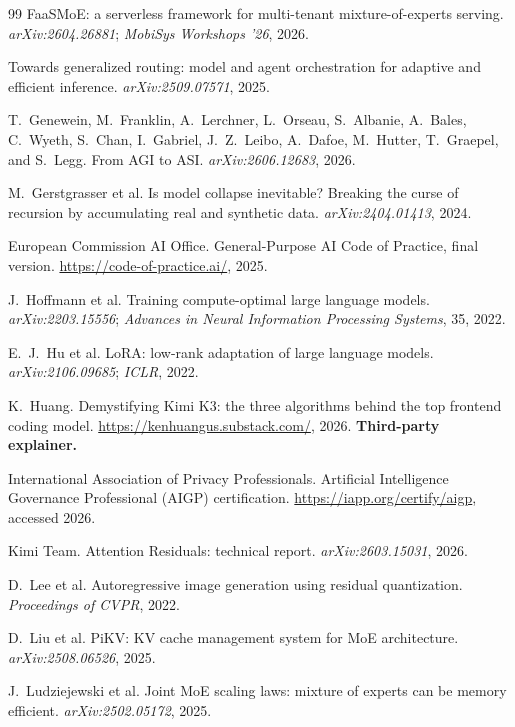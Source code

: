 \documentclass[11pt]{article}
\begin{document}
\begin{thebibliography}{99}
 FaaSMoE: a serverless framework for multi-tenant mixture-of-experts serving. \emph{arXiv:2604.26881}; \emph{MobiSys Workshops '26}, 2026.

 Towards generalized routing: model and agent orchestration for adaptive and efficient inference. \emph{arXiv:2509.07571}, 2025.

 T.~Genewein, M.~Franklin, A.~Lerchner, L.~Orseau, S.~Albanie, A.~Bales, C.~Wyeth, S.~Chan, I.~Gabriel, J.~Z.~Leibo, A.~Dafoe, M.~Hutter, T.~Graepel, and S.~Legg. From AGI to ASI. \emph{arXiv:2606.12683}, 2026.

 M.~Gerstgrasser et al. Is model collapse inevitable? Breaking the curse of recursion by accumulating real and synthetic data. \emph{arXiv:2404.01413}, 2024.

 European Commission AI Office. General-Purpose AI Code of Practice, final version. \url{https://code-of-practice.ai/}, 2025.

 J.~Hoffmann et al. Training compute-optimal large language models. \emph{arXiv:2203.15556}; \emph{Advances in Neural Information Processing Systems}, 35, 2022.

 E.~J.~Hu et al. LoRA: low-rank adaptation of large language models. \emph{arXiv:2106.09685}; \emph{ICLR}, 2022.

 K.~Huang. Demystifying Kimi K3: the three algorithms behind the top frontend coding model. \url{https://kenhuangus.substack.com/}, 2026. \textbf{Third-party explainer.}

 International Association of Privacy Professionals. Artificial Intelligence Governance Professional (AIGP) certification. \url{https://iapp.org/certify/aigp}, accessed 2026.

 Kimi Team. Attention Residuals: technical report. \emph{arXiv:2603.15031}, 2026.

 D.~Lee et al. Autoregressive image generation using residual quantization. \emph{Proceedings of CVPR}, 2022.

 D.~Liu et al. PiKV: KV cache management system for MoE architecture. \emph{arXiv:2508.06526}, 2025.

 J.~Ludziejewski et al. Joint MoE scaling laws: mixture of experts can be memory efficient. \emph{arXiv:2502.05172}, 2025.


\end{thebibliography}
\end{document}
